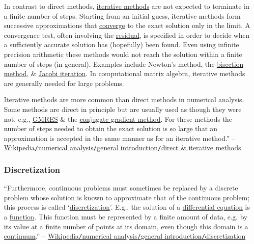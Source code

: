 \documentclass[oneside]{book}
\numberwithin{equation}{section}
\begin{document}
In contrast to direct methods, \href{https://en.wikipedia.org/wiki/Iterative_method}{iterative methods} are not expected to terminate in a finite number of steps. Starting from an initial guess, iterative methods form successive approximations that \href{https://en.wikipedia.org/wiki/Limit_of_a_sequence}{converge} to the exact solution only in the limit. A convergence test, often involving the \href{https://en.wikipedia.org/wiki/Residual_(numerical_analysis)}{residual}, is specified in order to decide when a sufficiently accurate solution has (hopefully) been found. Even using infinite precision arithmetic these methods would not reach the solution within a finite number of steps (in general). Examples include Newton's method, the \href{https://en.wikipedia.org/wiki/Bisection_method}{bisection method}, \& \href{https://en.wikipedia.org/wiki/Jacobi_iteration}{Jacobi iteration}. In computational matrix algebra, iterative methods are generally needed for large problems.

Iterative methods are more common than direct methods in numerical analysis. Some methods are direct in principle but are usually used as though they were not, e.g., \href{https://en.wikipedia.org/wiki/GMRES}{GMRES} \& the \href{https://en.wikipedia.org/wiki/Conjugate_gradient_method}{conjugate gradient method}. For these methods the number of steps needed to obtain the exact solution is so large that an approximation is accepted in the same manner as for an iterative method.'' -- \href{https://en.wikipedia.org/wiki/Numerical_analysis#Direct_and_iterative_methods}{Wikipedia\texttt{/}numerical analysis\texttt{/}general introduction\texttt{/}direct \& iterative methods}

\subsubsection{Discretization}
``Furthermore, continuous problems must sometimes be replaced by a discrete problem whose solution is known to approximate that of the continuous problem; this process is called `\href{https://en.wikipedia.org/wiki/Discretization}{discretization}'. E.g., the solution of a \href{https://en.wikipedia.org/wiki/Differential_equation}{differential equation} is a \href{https://en.wikipedia.org/wiki/Function_(mathematics)}{function}. This function must be represented by a finite amount of data, e.g. by its value at a finite number of points at its domain, even though this domain is a \href{https://en.wikipedia.org/wiki/Continuum_(set_theory)}{continuum}.'' -- \href{https://en.wikipedia.org/wiki/Numerical_analysis#Discretization}{Wikipedia\texttt{/}numerical analysis\texttt{/}general introduction\texttt{/}discretization}
\end{document}
